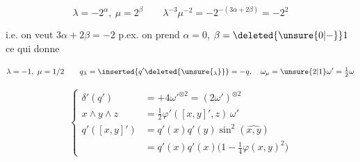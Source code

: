 \[
\lambda=-2^\alpha,\ \mu=2^\beta\qquad \lambda^{-3}\mu^{-2}=-2^{-(3\alpha+2\beta)}=-2^2
\]

i.e. on veut $3\alpha+2\beta=-2$ p.ex. on prend $\alpha=0$, $\beta=\deleted{\unsure{0|-}}1$ ce qui donne

\[
\lambda=-1,\ \mu=1/2\qquad q_\lambda=\inserted{q'\deleted{\unsure{_\lambda}}}=-q,\quad\omega_\mu=\unsure{2|1}\omega'=\tfrac12\omega
\]


\[
\left\{\begin{aligned}\delta'(q')&=+4\omega'^{\otimes2}=(2\omega')^{\otimes2}\\ x\wedge y\wedge z&=\tfrac12\varphi'([x,y]',z)\,\omega'\\ q'([x,y]')&=q'(x)q'(y)\sin^2(\widehat{x,y})\\ &=q'(x)q'(x)\bigl(1-\tfrac14\varphi(x,y)^{2}\bigr)\end{aligned}\right.
\]

